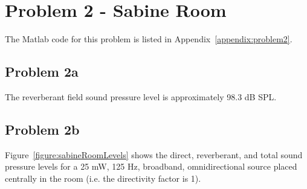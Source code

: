 {\newpage
\section*{Problem 2 - Sabine Room}

The Matlab code for this problem is listed in Appendix~\ref{appendix:problem2}.


\vspace{0.25cm}
\subsection*{Problem 2a}

The reverberant field sound pressure level is approximately 98.3 dB SPL.




\vspace{0.25cm}
\subsection*{Problem 2b}

Figure~\ref{figure:sabineRoomLevels} shows the direct, reverberant, and total sound pressure levels for a 25 mW, 125 Hz, broadband, omnidirectional source placed centrally in the room (i.e. the directivity factor is 1).

}
